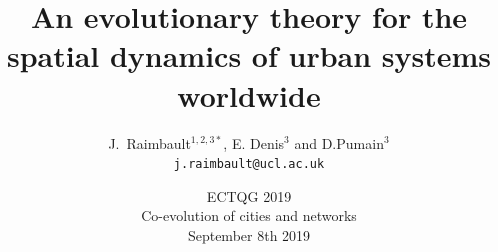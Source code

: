 



\title{An evolutionary theory for the spatial dynamics of urban systems worldwide}
\author{J.~Raimbault$^{1,2,3\ast}$, E. Denis$^3$ and D.Pumain$^3$\\
\texttt{j.raimbault@ucl.ac.uk}
}




\date{ECTQG 2019\\
Co-evolution of cities and networks\\
September 8th 2019
}

\frame{\maketitle}


